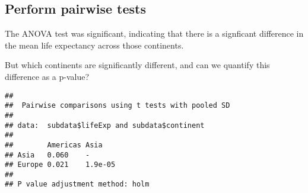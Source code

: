 \documentclass[]{book}
\makeatletter
\newenvironment{Shaded}{\begin{snugshade}}{\end{snugshade}}
\newcommand{\KeywordTok}[1]{\textcolor[rgb]{0.13,0.29,0.53}{\textbf{#1}}}
\newcommand{\DataTypeTok}[1]{\textcolor[rgb]{0.13,0.29,0.53}{#1}}
\newcommand{\DecValTok}[1]{\textcolor[rgb]{0.00,0.00,0.81}{#1}}
\newcommand{\StringTok}[1]{\textcolor[rgb]{0.31,0.60,0.02}{#1}}
\newcommand{\CommentTok}[1]{\textcolor[rgb]{0.56,0.35,0.01}{\textit{#1}}}
\newcommand{\OperatorTok}[1]{\textcolor[rgb]{0.81,0.36,0.00}{\textbf{#1}}}
\newcommand{\NormalTok}[1]{#1}
\newenvironment{kframe}{%
\medskip{}
\setlength{\fboxsep}{.8em}
 \def\at@end@of@kframe{}%
 \ifinner\ifhmode%
  \def\at@end@of@kframe{\end{minipage}}%
  \begin{minipage}{\columnwidth}%
 \fi\fi%
 \def\FrameCommand##1{\hskip\@totalleftmargin \hskip-\fboxsep
 \colorbox{shadecolor}{##1}\hskip-\fboxsep
     \hskip-\linewidth \hskip-\@totalleftmargin \hskip\columnwidth}%
 \MakeFramed {\advance\hsize-\width
   \@totalleftmargin\z@ \linewidth\hsize
   \@setminipage}}%
 {\par\unskip\endMakeFramed%
 \at@end@of@kframe}
\renewenvironment{Shaded}{\begin{kframe}}{\end{kframe}}
\theoremstyle{definition}
\theoremstyle{definition}
\theoremstyle{definition}
\theoremstyle{remark}
\makeatother
\begin{document}
\subsection{Perform pairwise tests}\label{perform-pairwise-tests}

The ANOVA test was significant, indicating that there is a signficant
difference in the mean life expectancy across those continents.

But which continents are significantly different, and can we quantify
this difference as a p-value?

\begin{Shaded}
\end{Shaded}

\begin{verbatim}
## 
##  Pairwise comparisons using t tests with pooled SD 
## 
## data:  subdata$lifeExp and subdata$continent 
## 
##        Americas Asia   
## Asia   0.060    -      
## Europe 0.021    1.9e-05
## 
## P value adjustment method: holm
\end{verbatim}

\begin{Shaded}
\end{Shaded}
\end{document}
